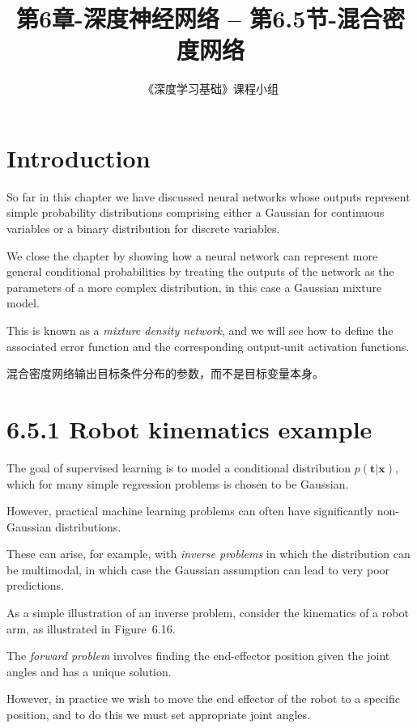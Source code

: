 \documentclass{article}
\title{第6章-深度神经网络 -- 第6.5节-混合密度网络}
\author{《深度学习基础》课程小组}
\begin{document}
\maketitle
\tableofcontents

\setlength{\parindent}{0pt} %
\setlength{\parskip}{1.5em} %

\section{Introduction}

So far in this chapter we have discussed neural networks whose outputs represent simple probability distributions comprising either a Gaussian for continuous variables or a binary distribution for discrete variables. 

We close the chapter by showing how a neural network can represent more general conditional probabilities by treating the outputs of the network as the parameters of a more complex distribution, in this case a Gaussian mixture model. 

This is known as a \emph{mixture density network}, and we will see how to define the associated error function and the corresponding output-unit activation functions.

{\color{red}
混合密度网络输出目标条件分布的参数，而不是目标变量本身。
}

\section{6.5.1 Robot kinematics example}

The goal of supervised learning is to model a conditional distribution $p(\mathbf{t}|\mathbf{x})$, which for many simple regression problems is chosen to be Gaussian. 

However, practical machine learning problems can often have significantly non-Gaussian distributions. 

These can arise, for example, with \emph{inverse problems} in which the distribution can be multimodal, in which case the Gaussian assumption can lead to very poor predictions.

As a simple illustration of an inverse problem, consider the kinematics of a robot arm, as illustrated in Figure~6.16. 

The \emph{forward problem} involves finding the end-effector position given the joint angles and has a unique solution. 

However, in practice we wish to move the end effector of the robot to a specific position, and to do this we must set appropriate joint angles. 
\end{document}
